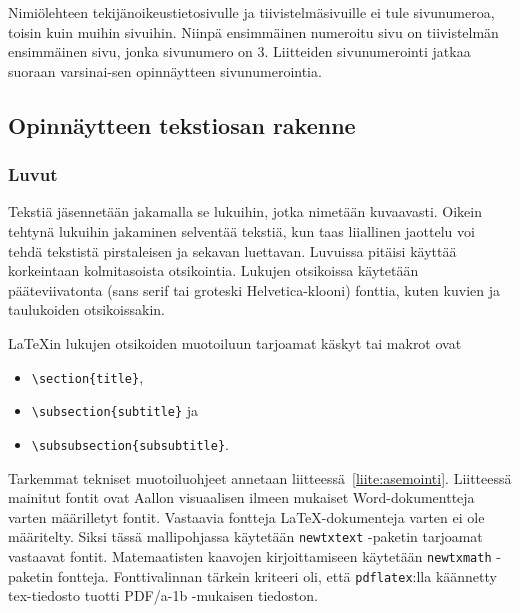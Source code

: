 \documentclass[finnish, 12pt, a4paper, elec, utf8, a-2b, online]{aaltothesis}
\begin{document}
Nimiölehteen tekijänoikeustietosivulle ja tiivistelmäsivuille ei tule 
sivunumeroa, toisin kuin muihin sivuihin. Niinpä ensimmäinen numeroitu sivu on 
tiivistelmän ensimmäinen sivu, jonka sivunumero on 3. Liitteiden sivunumerointi 
jatkaa suoraan varsinai-sen opinnäytteen sivunumerointia.


\subsection{Opinnäytteen tekstiosan rakenne}
\subsubsection{Luvut}

Tekstiä jäsennetään jakamalla se lukuihin, jotka nimetään kuvaavasti. Oikein 
tehtynä lukuihin jakaminen selventää tekstiä, kun taas liiallinen jaottelu voi 
tehdä tekstistä pirstaleisen ja sekavan luettavan. Luvuissa pitäisi käyttää 
korkeintaan kolmitasoista otsikointia. Lukujen otsikoissa käytetään 
pääteviivatonta (sans serif tai groteski Helvetica-klooni) fonttia, kuten 
kuvien ja taulukoiden otsikoissakin.

\LaTeX{}in lukujen otsikoiden muotoiluun tarjoamat käskyt tai makrot ovat 
\begin{itemize}
	\setlength{\itemsep}{0pt}
	\item[] \verb+\section{title}+,
	\item[] \verb+\subsection{subtitle}+ ja
	\item[] \verb+\subsubsection{subsubtitle}+.
\end{itemize}

Tarkemmat tekniset muotoiluohjeet annetaan liitteessä~\ref{liite:asemointi}. 
Liitteessä mainitut fontit ovat Aallon visuaalisen ilmeen mukaiset 
Word-dokumentteja varten määrilletyt fontit. Vastaavia fontteja 
\LaTeX{}-dokumenteja varten ei ole määritelty. Siksi tässä mallipohjassa 
käytetään \verb+newtxtext+ -paketin tarjoamat vastaavat fontit. Matemaatisten 
kaavojen kirjoittamiseen käytetään \verb+newtxmath+ -paketin fontteja. 
Fonttivalinnan tärkein kriteeri oli, että \texttt{pdflatex}:lla käännetty 
tex-tiedosto tuotti PDF/a-1b -mukaisen tiedoston.
\end{document}
